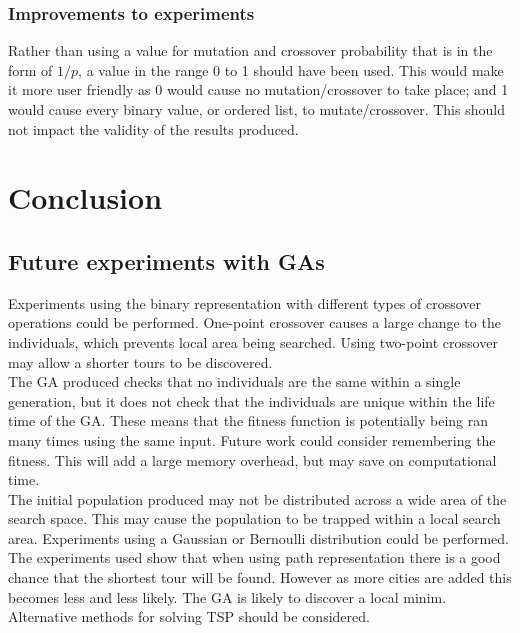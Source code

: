 \documentclass[10pt,a4paper,openbib]{article}
\begin{document}
\begin{multicols}{2}
\subsubsection{Improvements to experiments}
Rather than using a value for mutation and crossover probability that is in the form of $1 / p$, a value in the range 0 to 1 should have been used. This would make it more user friendly as 0 would cause no mutation/crossover to take place; and 1 would cause every binary value, or ordered list, to mutate/crossover. This should not impact the validity of the results produced. \\

\section{Conclusion}

\subsection{Future experiments with GAs}
Experiments using the binary representation with different types of crossover operations could be performed. One-point crossover causes a large change to the individuals, which prevents local area being searched. Using two-point crossover may allow a shorter tours to be discovered.\\

\noindent The GA produced checks that no individuals are the same within a single generation, but it does not check that the individuals are unique within the life time of the GA. These means that the fitness function is potentially being ran many times using the same input. Future work could consider remembering the fitness. This will add a large memory overhead, but may save on computational time.\\

\noindent The initial population produced may not be distributed across a wide area of the search space. This may cause the population to be trapped within a local search area. Experiments using a Gaussian or Bernoulli distribution could be performed.\\

\noindent The experiments used show that when using path representation there is a good chance that the shortest tour will be found. However as more cities are added this becomes less and less likely. The GA is likely to discover a local minim. Alternative methods for solving TSP should be considered. 


\end{multicols}
\end{document}
